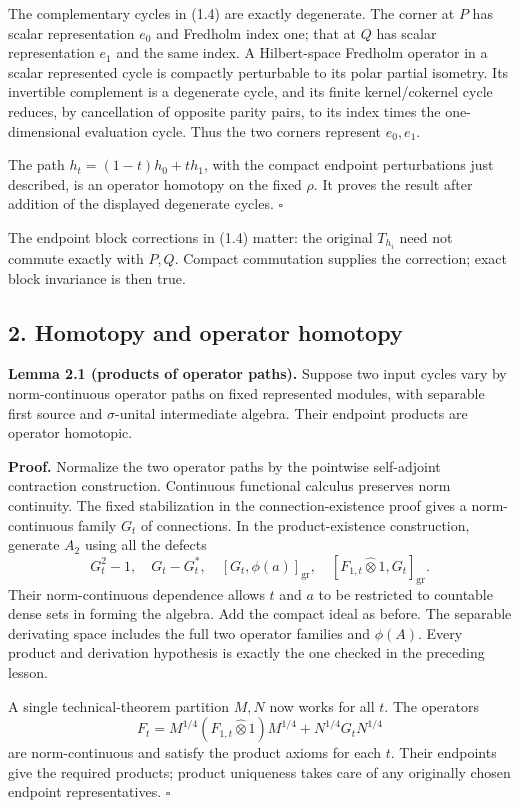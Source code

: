 \documentclass[
  11pt,
]{article}
\begin{document}
The complementary cycles in (1.4) are exactly degenerate. The corner at
\(P\) has scalar representation \(e_0\) and Fredholm index one; that at
\(Q\) has scalar representation \(e_1\) and the same index. A
Hilbert-space Fredholm operator in a scalar represented cycle is
compactly perturbable to its polar partial isometry. Its invertible
complement is a degenerate cycle, and its finite kernel/cokernel cycle
reduces, by cancellation of opposite parity pairs, to its index times
the one-dimensional evaluation cycle. Thus the two corners represent
\(e_0,e_1\).

The path \(h_t=(1-t)h_0+th_1\), with the compact endpoint perturbations
just described, is an operator homotopy on the fixed \(\rho\). It proves
the result after addition of the displayed degenerate cycles.
\(\square\)

The endpoint block corrections in (1.4) matter: the original \(T_{h_i}\)
need not commute exactly with \(P,Q\). Compact commutation supplies the
correction; exact block invariance is then true.

\subsection{2. Homotopy and operator
homotopy}\label{homotopy-and-operator-homotopy}

\textbf{Lemma 2.1 (products of operator paths).} Suppose two input
cycles vary by norm-continuous operator paths on fixed represented
modules, with separable first source and \(\sigma\)-unital intermediate
algebra. Their endpoint products are operator homotopic.

\textbf{Proof.} Normalize the two operator paths by the pointwise
self-adjoint contraction construction. Continuous functional calculus
preserves norm continuity. The fixed stabilization in the
connection-existence proof gives a norm-continuous family \(G_t\) of
connections. In the product-existence construction, generate \(A_2\)
using all the defects \[
G_t^2-1,\quad G_t-G_t^*,\quad
[G_t,\phi(a)]_{\mathrm{gr}},\quad
[F_{1,t}\widehat\otimes1,G_t]_{\mathrm{gr}}.
\] Their norm-continuous dependence allows \(t\) and \(a\) to be
restricted to countable dense sets in forming the algebra. Add the
compact ideal as before. The separable derivating space includes the
full two operator families and \(\phi(A)\). Every product and derivation
hypothesis is exactly the one checked in the preceding lesson.

A single technical-theorem partition \(M,N\) now works for all \(t\).
The operators \[
F_t=M^{1/4}(F_{1,t}\widehat\otimes1)M^{1/4}
+N^{1/4}G_tN^{1/4}
\tag{2.1}
\] are norm-continuous and satisfy the product axioms for each \(t\).
Their endpoints give the required products; product uniqueness takes
care of any originally chosen endpoint representatives. \(\square\)
\end{document}
